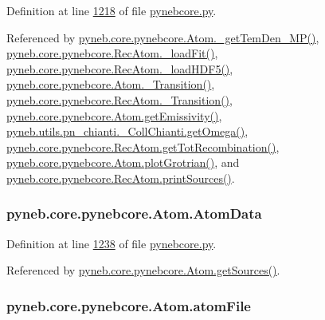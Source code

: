 Definition at line \hyperlink{pynebcore_8py_source_l01218}{1218} of file \hyperlink{pynebcore_8py_source}{pynebcore.\-py}.



Referenced by \hyperlink{pynebcore_8py_source_l02046}{pyneb.\-core.\-pynebcore.\-Atom.\-\_\-get\-Tem\-Den\-\_\-\-M\-P()}, \hyperlink{pynebcore_8py_source_l02754}{pyneb.\-core.\-pynebcore.\-Rec\-Atom.\-\_\-load\-Fit()}, \hyperlink{pynebcore_8py_source_l02714}{pyneb.\-core.\-pynebcore.\-Rec\-Atom.\-\_\-load\-H\-D\-F5()}, \hyperlink{pynebcore_8py_source_l01433}{pyneb.\-core.\-pynebcore.\-Atom.\-\_\-\-Transition()}, \hyperlink{pynebcore_8py_source_l02812}{pyneb.\-core.\-pynebcore.\-Rec\-Atom.\-\_\-\-Transition()}, \hyperlink{pynebcore_8py_source_l01782}{pyneb.\-core.\-pynebcore.\-Atom.\-get\-Emissivity()}, \hyperlink{pn__chianti_8py_source_l00507}{pyneb.\-utils.\-pn\-\_\-chianti.\-\_\-\-Coll\-Chianti.\-get\-Omega()}, \hyperlink{pynebcore_8py_source_l02851}{pyneb.\-core.\-pynebcore.\-Rec\-Atom.\-get\-Tot\-Recombination()}, \hyperlink{pynebcore_8py_source_l02443}{pyneb.\-core.\-pynebcore.\-Atom.\-plot\-Grotrian()}, and \hyperlink{pynebcore_8py_source_l02912}{pyneb.\-core.\-pynebcore.\-Rec\-Atom.\-print\-Sources()}.

\hypertarget{classpyneb_1_1core_1_1pynebcore_1_1_atom_a7246a8b1ce71eb9d38f580a6ca9fe09e}{
\subsubsection[{Atom\-Data}]{\setlength{\rightskip}{0pt plus 5cm}pyneb.\-core.\-pynebcore.\-Atom.\-Atom\-Data}}\label{classpyneb_1_1core_1_1pynebcore_1_1_atom_a7246a8b1ce71eb9d38f580a6ca9fe09e}


Definition at line \hyperlink{pynebcore_8py_source_l01238}{1238} of file \hyperlink{pynebcore_8py_source}{pynebcore.\-py}.



Referenced by \hyperlink{pynebcore_8py_source_l01516}{pyneb.\-core.\-pynebcore.\-Atom.\-get\-Sources()}.

\hypertarget{classpyneb_1_1core_1_1pynebcore_1_1_atom_a0d74c41b1e0ac1a9cd5591467769d07f}{
\subsubsection[{atom\-File}]{\setlength{\rightskip}{0pt plus 5cm}pyneb.\-core.\-pynebcore.\-Atom.\-atom\-File}}\label{classpyneb_1_1core_1_1pynebcore_1_1_atom_a0d74c41b1e0ac1a9cd5591467769d07f}



